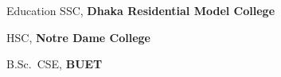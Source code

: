 \begin{rubric}{Education}
\entry*[2015 -- 2017]%
	SSC, \textbf{Dhaka Residential Model College}

\entry*[2017 -- 2019]%
	HSC, \textbf{Notre Dame College}

%
	B.Sc.~CSE, \textbf{BUET}

\end{rubric}
